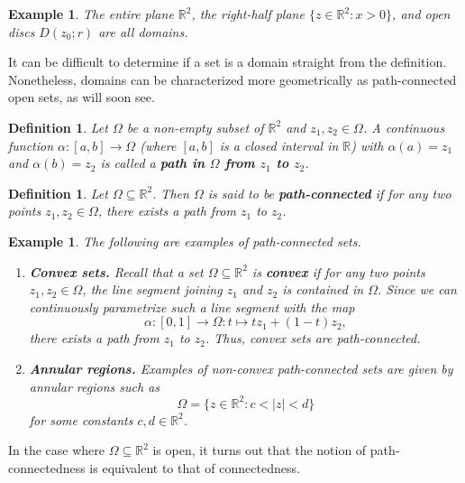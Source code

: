 \documentclass[10pt]{article}
\newcommand{\R}{\mathbb{R}}
\theoremstyle{newstyle}
\newtheorem{defn}[thm]{Definition}
\newtheorem{exmp}[thm]{Example}
\begin{document}
\begin{exmp}
The entire plane $\R^2$, the right-half plane $\{z \in \R^2 : x > 0\}$, and open discs 
$D(z_0; r)$ are all domains.
\end{exmp}

It can be difficult to determine if a set is a domain straight from the definition. Nonetheless, 
domains can be characterized more geometrically as path-connected open sets, as will soon see.

\begin{defn}
Let $\Omega$ be a non-empty subset of $\R^2$ and $z_1, z_2 \in \Omega$. A continuous function 
$\alpha : [a, b] \to \Omega$ (where $[a, b]$ is a closed interval in $\R$) 
with $\alpha(a) = z_1$ and $\alpha(b) = z_2$ is called a {\bf path in $\Omega$ from $z_1$ to $z_2$}.
\end{defn}

\begin{defn}
Let $\Omega \subseteq \R^2$. Then $\Omega$ is said to be {\bf path-connected} if for any 
two points $z_1, z_2 \in \Omega$, there exists a path from $z_1$ to $z_2$.
\end{defn}

\begin{exmp}
The following are examples of path-connected sets.
\begin{enumerate}[(1)]
    \item {\bf Convex sets.} Recall that a set $\Omega \subseteq \R^2$ is {\bf convex} if 
    for any two points $z_1, z_2 \in \Omega$, the line segment joining $z_1$ and $z_2$ is 
    contained in $\Omega$. Since we can continuously parametrize such a line segment 
    with the map 
    \[ \alpha : [0, 1] \to \Omega : t \mapsto tz_1 + (1-t)z_2, \] 
    there exists a path from $z_1$ to $z_2$. Thus, convex sets are path-connected.
    \item {\bf Annular regions.} Examples of non-convex path-connected sets are given by annular 
    regions such as 
    \[ \Omega = \{z \in \R^2 : c < |z| < d\} \]
    for some constants $c, d \in \R^2$.
\end{enumerate}
\end{exmp}

In the case where $\Omega \subseteq \R^2$ is open, it turns out that the notion of path-connectedness 
is equivalent to that of connectedness. 
\end{document}
